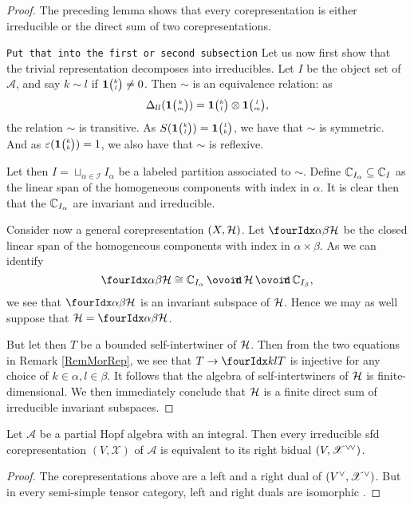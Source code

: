 \begin{proof} 
The preceding lemma shows that  every corepresentation is either
irreducible or the direct sum of two corepresentations. 

\texttt{Put that into the first or second subsection}
Let us now first show that the trivial representation decomposes into irreducibles. Let $I$ be the object set of $\mathscr{A}$, and say $k\sim l$ if $\mathbf{1}{\tiny {\begin{pmatrix} k\\l\end{pmatrix}}}\neq 0$. Then $\sim$ is an equivalence relation: as \[\Delta_{ll}(\mathbf{1}{\tiny {\begin{pmatrix} k\\m\end{pmatrix}}}) = \mathbf{1}{\tiny {\begin{pmatrix} k\\l\end{pmatrix}}}\otimes \mathbf{1}{\tiny {\begin{pmatrix} l\\m\end{pmatrix}}},\] the relation $\sim$ is transitive. As $S(\mathbf{1}{\tiny {\begin{pmatrix} k\\l\end{pmatrix}}}) = \mathbf{1}{\tiny {\begin{pmatrix} l\\k\end{pmatrix}}}$, we have that $\sim$ is symmetric. And as $\varepsilon(\mathbf{1}{\tiny {\begin{pmatrix} k\\k\end{pmatrix}}})=1$, we also have that $\sim$ is reflexive. 

Let then $I = \sqcup_{\alpha\in \mathscr{I}} I_{\alpha}$ be a labeled partition associated to $\sim$. Define $\mathbb{C}_{I_{\alpha}}\subseteq \mathbb{C}_I$ as the linear span of the homogeneous components with index in $\alpha$. It is clear then that the $\mathbb{C}_{I_{\alpha}}$ are invariant and irreducible.

Consider now a general corepresentation $(X,\mathcal{H})$. Let $\Grd{\Hsp}{\alpha}{\beta}$ be the closed linear span of the homogeneous components with index in $\alpha\times \beta$. As we can identify \[\Grd{\Hsp}{\alpha}{\beta} \cong \C_{I_{\alpha}}\,\Circt\, \Hsp\,\Circt\, \C_{I_{\beta}},\] we see that $\Grd{\Hsp}{\alpha}{\beta}$ is an invariant subspace of $\mathcal{H}$. Hence we may as well suppose that $\Hsp = \Grd{\Hsp}{\alpha}{\beta}$. 

But let then $T$ be a bounded self-intertwiner of $\mathcal{H}$. Then from the two equations in Remark \ref{RemMorRep}, we see that $T\rightarrow \Gru{T}{k}{l}$ is injective for any choice of $k\in \alpha,l\in \beta$. It follows that the algebra of self-intertwiners of $\mathcal{H}$ is finite-dimensional. We then immediately conclude that $\mathcal{H}$ is a finite direct sum of irreducible invariant subspaces.
\end{proof} 

\begin{Cor}
  Let $\mathscr{A}$ be a partial Hopf algebra with an integral. Then
  every irreducible sfd corepresentation $(V,\mathscr{X})$ of
  $\mathscr{A}$ is equivalent to its right bidual
  $(V,\mathscr{X}^{\vee}{}\!^{\vee})$.
\end{Cor}
\begin{proof}
  The corepresentations above are a left and a right dual of
  $(V^{\vee},\mathscr{X}^{\vee})$. But in every semi-simple tensor
  category, left and right duals are isomorphic \cite{}. 
\end{proof}

